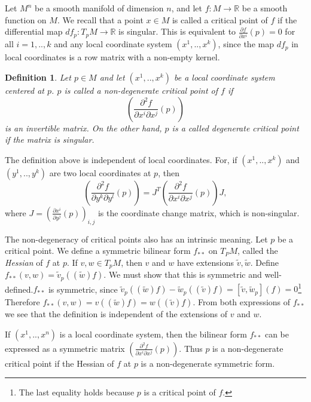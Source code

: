 \documentclass[a4paper,11pt,reqno]{amsart}
\newtheorem{defn}[thm]{Definition}
\newcommand{\RR}{\mathbb{R}}      %
\begin{document}
Let $M^n$ be a smooth manifold of dimension $n$, and let $f: M \to \RR$ be a
smooth function on $M$. We recall that a point $x \in M$ is called a critical
point of $f$ if the differential map $ df_p : T_pM \to \RR $ is singular. This
is equivalent to $\frac{\partial f}{\partial x^i} (p) = 0$ for all $i = 1,
.. ,k$ and any local coordinate system $(x^1, .., x^k)$, since the map $df_p$ in
local coordinates is a row matrix with a non-empty kernel.

\begin{defn}
  Let $p \in M$ and let $(x^1, .., x^k)$ be a local coordinate system centered
  at $p$. $p$ is called a non-degenerate critical point of $f$ if
  \begin{equation}
    \left( \frac{\partial^2 f}{\partial x^i \partial x^j} (p) \right)
  \end{equation}
  is an invertible matrix. On the other hand, $p$ is a called degenerate
  critical point if the matrix is singular.
\end{defn}

The definition above is independent of local coordinates. For, if $(x^1, ..,
x^k)$ and $(y^1, .., y^k)$ are two local coordinates at $p$, then
\begin{equation}
      \left( \frac{\partial^2 f}{\partial y^k \partial y^l} (p) \right) =
      J^T\left( \frac{\partial^2 f}{\partial x^i \partial x^j} (p) \right)J,
\end{equation}
where $J = \left( \frac{\partial x^i}{\partial y^j}(p) \right)_{i,j}$ is the
coordinate change matrix, which is non-singular.

The non-degeneracy of critical points also has an intrinsic meaning. Let $p$ be
a critical point. We define a symmetric bilinear form $f_{**}$ on $T_PM$, called
the \emph{Hessian} of $f$ at $p$. If $v, w \in T_pM$, then $v$ and $w$ have
extensions $\tilde{v}, \tilde{w}$. Define $f_{**}(v, w) =
\tilde{v}_p((\tilde{w})f)$. We must show that this is symmetric and
well-defined.$f_{**}$ is symmetric, since $\tilde{v}_p((\tilde{w})f) -
\tilde{w}_p((\tilde{v})f) = [\tilde{v}, \tilde{w}_p](f) = 0$\footnote{The last
  equality holds because $p$ is a critical point of $f$.} Therefore $f_{**}(v,
w) = v((\tilde{w})f) = w((\tilde{v})f)$. From both expressions of $f_{**}$ we
see that the definition is independent of the extensions of $v$ and $w$.

If $(x^1, .., x^n)$ is a local coordinate system, then the bilinear form
$f_{**}$ can be expressed as a symmetric matrix $\left(\frac{\partial^2
    f}{\partial x^i \partial x^j}(p)\right)$. Thus $p$ is a non-degenerate
critical point if the Hessian of $f$ at $p$ is a non-degenerate symmetric form.
\end{document}
